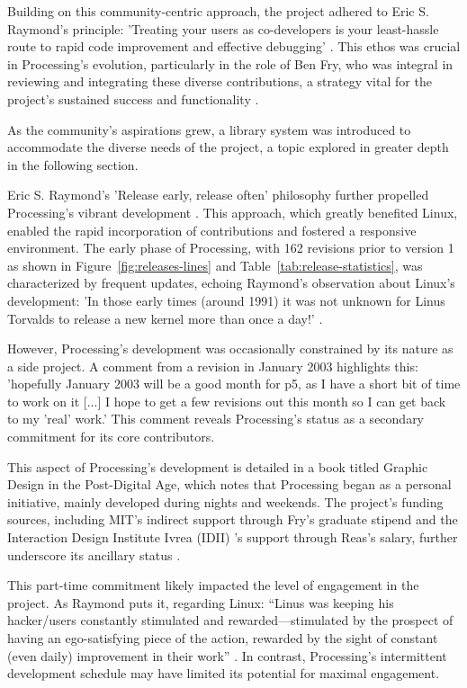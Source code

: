 Building on this community-centric approach, the project adhered to Eric S. Raymond’s principle: ’Treating your users as co-developers is your least-hassle route to rapid code improvement and effective debugging’ \parencite[27]{raymondCathedralBazaar1999}. This ethos was crucial in Processing’s evolution, particularly in the role of Ben Fry, who was integral in reviewing and integrating these diverse contributions, a strategy vital for the project’s sustained success and functionality \parencite{fryProcessingContributionGuide2022}.

As the community’s aspirations grew, a library system was introduced to accommodate the diverse needs of the project, a topic explored in greater depth in the following section.

Eric S. Raymond’s ’Release early, release often’ philosophy further propelled Processing’s vibrant development \parencite[28]{raymondCathedralBazaar1999}. This approach, which greatly benefited Linux, enabled the rapid incorporation of contributions and fostered a responsive environment. The early phase of Processing, with 162 revisions prior to version 1 as shown in Figure~\ref{fig:releases-lines} and Table~\ref{tab:release-statistics}, was characterized by frequent updates, echoing Raymond’s observation about Linux’s development: ’In those early times (around 1991) it was not unknown for Linus Torvalds to release a new kernel more than once a day!’ \parencite[28]{raymondCathedralBazaar1999}.

However, Processing’s development was occasionally constrained by its nature as a side project. A comment from a revision in January 2003 highlights this: ’hopefully January 2003 will be a good month for p5, as I have a short bit of time to work on it [...] I hope to get a few revisions out this month so I can get back to my ’real’ work.’ This comment reveals Processing’s status as a secondary commitment for its core contributors.

This aspect of Processing’s development is detailed in a book titled Graphic Design in the Post-Digital Age, which notes that Processing began as a personal initiative, mainly developed during nights and weekends. The project’s funding sources, including MIT’s indirect support through Fry’s graduate stipend and the Interaction Design Institute Ivrea (IDII) ’s support through Reas’s salary, further underscore its ancillary status \parencite[396]{conradGraphicDesignPostdigital2021}.

This part-time commitment likely impacted the level of engagement in the project. As Raymond puts it, regarding Linux: \enquote{Linus was keeping his hacker/users constantly stimulated and rewarded—stimulated by the prospect of having an ego-satisfying piece of the action, rewarded by the sight of constant (even daily) improvement in their work} \parencite[28]{raymondCathedralBazaar1999}. In contrast, Processing’s intermittent development schedule may have limited its potential for maximal engagement.

